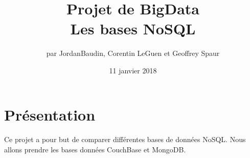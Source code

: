 \documentclass{article}
\title{Projet de BigData \\ Les bases NoSQL}
\author{par JordanBaudin, Corentin LeGuen et Geoffrey Spaur}
\date{11 janvier 2018}
\begin{document}
\maketitle
\newpage
\tableofcontents{}
\newpage
\section{Présentation}
  \paragraph{}
  Ce projet a pour but de comparer différentes bases de données NoSQL.
  Nous allons prendre les bases données CouchBase et MongoDB.
  
\end{document}
